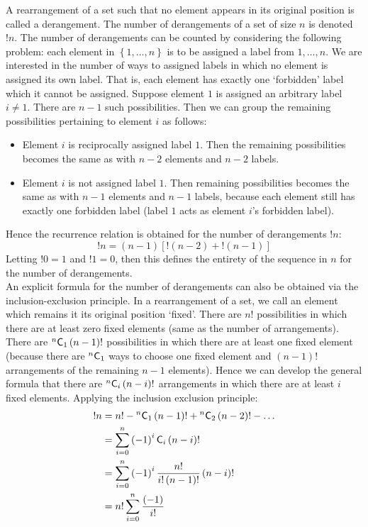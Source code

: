\documentclass[11pt]{report} %
\begin{document}
A rearrangement of a set such that no element appears in its original position is called a derangement. The number of derangements of a set of size $n$ is denoted $!n$. The number of derangements can be counted by considering the following problem: each element in $\left\{1, \dots, n\right\}$ is to be assigned a label from $1, \dots, n$. We are interested in the number of ways to assigned labels in which no element is assigned its own label. That is, each element has exactly one `forbidden' label which it cannot be assigned. Suppose element $1$ is assigned an arbitrary label $i \neq 1$. There are $n - 1$ such possibilities. Then we can group the remaining possibilities pertaining to element $i$ as follows:
\begin{itemize}
\item Element $i$ is reciprocally assigned label $1$. Then the remaining possibilities becomes the same as with $n - 2$ elements and $n - 2$ labels.
\item Element $i$ is not assigned label $1$. Then remaining possibilities becomes the same as with $n - 1$ elements and $n - 1$ labels, because each element still has exactly one forbidden label (label $1$ acts as element $i$'s forbidden label).
\end{itemize}
Hence the recurrence relation is obtained for the number of derangements $!n$:
\begin{equation}
!n = \left(n - 1\right)\left[!\left(n - 2\right) + !\left(n  - 1\right)\right]
\end{equation}
Letting $!0 = 1$ and $!1 = 0$, then this defines the entirety of the sequence in $n$ for the number of derangements. \\

An explicit formula for the number of derangements can also be obtained via the inclusion-exclusion principle. In a rearrangement of a set, we call an element which remains it its original position `fixed'. There are $n!$ possibilities in which there are at least zero fixed elements (same as the number of arrangements). There are $\mathstrut^{n}\mathsf{C}_{1}\left(n - 1\right)!$ possibilities in which there are at least one fixed element (because there are $\mathstrut^{n}\mathsf{C}_{1}$ ways to choose one fixed element and $\left(n  -1\right)!$ arrangements of the remaining $n - 1$ elements). Hence we can develop the general formula that there are $\mathstrut^{n}\mathsf{C}_{i}\left(n - i\right)!$ arrangements in which there are at least $i$ fixed elements. Applying the inclusion exclusion principle:
\begin{align}
!n &= n! - \mathstrut^{n}\mathsf{C}_{1}\left(n - 1\right)! + \mathstrut^{n}\mathsf{C}_{2}\left(n - 2\right)! - \dots \\
&= \sum_{i = 0}^{n}\left(-1\right)^{i}\mathsf{C}_{i}\left(n - i\right)! \\
&= \sum_{i = 0}^{n}\left(-1\right)^{i}\dfrac{n!}{i!\left(n - 1\right)!}\left(n - i\right)! \\
&= n!\sum_{i = 0}^{n}\dfrac{\left(-1\right)}{i!}
\end{align}
\end{document}
